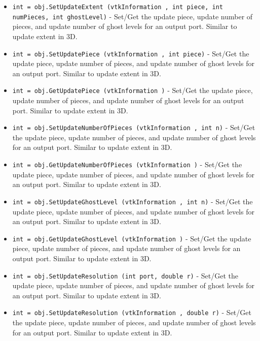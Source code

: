 \begin{itemize}
\item  \verb|int = obj.SetUpdateExtent (vtkInformation , int piece, int numPieces, int ghostLevel)| -  Set/Get the update piece, update number of pieces, and update
 number of ghost levels for an output port.  Similar to update
 extent in 3D.

\item  \verb|int = obj.SetUpdatePiece (vtkInformation , int piece)| -  Set/Get the update piece, update number of pieces, and update
 number of ghost levels for an output port.  Similar to update
 extent in 3D.

\item  \verb|int = obj.GetUpdatePiece (vtkInformation )| -  Set/Get the update piece, update number of pieces, and update
 number of ghost levels for an output port.  Similar to update
 extent in 3D.

\item  \verb|int = obj.SetUpdateNumberOfPieces (vtkInformation , int n)| -  Set/Get the update piece, update number of pieces, and update
 number of ghost levels for an output port.  Similar to update
 extent in 3D.

\item  \verb|int = obj.GetUpdateNumberOfPieces (vtkInformation )| -  Set/Get the update piece, update number of pieces, and update
 number of ghost levels for an output port.  Similar to update
 extent in 3D.

\item  \verb|int = obj.SetUpdateGhostLevel (vtkInformation , int n)| -  Set/Get the update piece, update number of pieces, and update
 number of ghost levels for an output port.  Similar to update
 extent in 3D.

\item  \verb|int = obj.GetUpdateGhostLevel (vtkInformation )| -  Set/Get the update piece, update number of pieces, and update
 number of ghost levels for an output port.  Similar to update
 extent in 3D.

\item  \verb|int = obj.SetUpdateResolution (int port, double r)| -  Set/Get the update piece, update number of pieces, and update
 number of ghost levels for an output port.  Similar to update
 extent in 3D.

\item  \verb|int = obj.SetUpdateResolution (vtkInformation , double r)| -  Set/Get the update piece, update number of pieces, and update
 number of ghost levels for an output port.  Similar to update
 extent in 3D.


\end{itemize}
